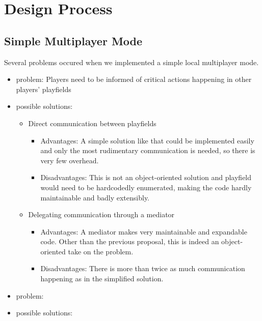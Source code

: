 \section{Design Process}
\subsection{Simple Multiplayer Mode}
%
Several problems occured when we implemented a simple local multiplayer mode.

\begin{itemize}
%
  \item problem: Players need to be informed of critical actions happening in other players' playfields 
  \item possible solutions:

    \begin{itemize}
      \item Direct communication between playfields
      \begin{itemize}
        \item Advantages: A simple solution like that could be implemented easily and only the most rudimentary communication is needed, so there is  very few overhead.
        \item Disadvantages: This is not an object-oriented solution and playfield would need to be hardcodedly enumerated, making the code hardly maintainable and badly extensibly. 
      \end{itemize}

      \item Delegating communication through a mediator
      \begin{itemize}
        \item Advantages: A mediator makes very maintainable and expandable code. Other than the previous proposal, this is indeed an object-oriented take on the problem.
        \item Disadvantages: There is more than twice as much communication happening as in the simplified solution.
      \end{itemize}
    \end{itemize}

  \item problem:
  \item possible solutions:
%
\end{itemize}